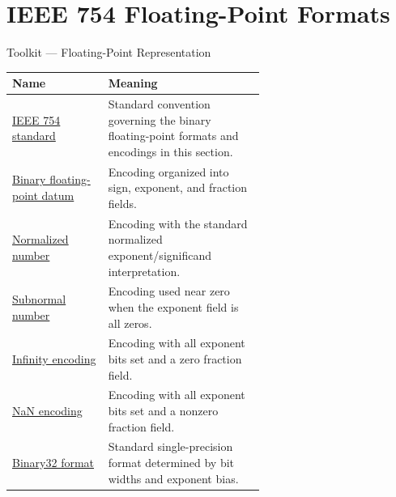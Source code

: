 \section{IEEE 754 Floating-Point Formats}

\begin{toolkitbox}{Toolkit --- Floating-Point Representation}
\small
\begin{tabular}{l p{0.62\linewidth}}
\toprule
\textbf{Name} & \textbf{Meaning} \\
\midrule
\hyperref[def:numerical-analysis-ieee-754-standard]{IEEE 754 standard} &
Standard convention governing the binary floating-point formats and encodings in this section. \\
\hyperref[def:numerical-analysis-ieee-754-binary-floating-point-datum]{Binary floating-point datum} &
Encoding organized into sign, exponent, and fraction fields. \\
\hyperref[def:numerical-analysis-normalized-ieee-754-binary-number]{Normalized number} &
Encoding with the standard normalized exponent/significand interpretation. \\
\hyperref[def:numerical-analysis-subnormal-ieee-754-binary-number]{Subnormal number} &
Encoding used near zero when the exponent field is all zeros. \\
\hyperref[def:numerical-analysis-ieee-754-infinity-encoding]{Infinity encoding} &
Encoding with all exponent bits set and a zero fraction field. \\
\hyperref[def:numerical-analysis-ieee-754-nan-encoding]{NaN encoding} &
Encoding with all exponent bits set and a nonzero fraction field. \\
\hyperref[def:numerical-analysis-ieee-754-binary32-format]{Binary32 format} &
Standard single-precision format determined by bit widths and exponent bias. \\
\bottomrule
\end{tabular}
\end{toolkitbox}


